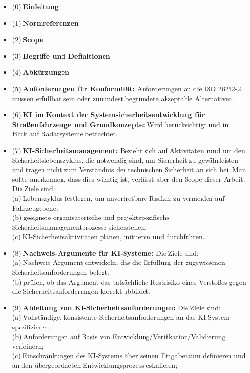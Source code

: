 \begin{itemize}
  \item[\dotY] (0) \textbf{Einleitung}
  \item[\dotR] (1) \textbf{Normreferenzen}
  \item[\dotY] (2) \textbf{Scope}
  \item[\dotR] (3) \textbf{Begriffe und Definitionen}
  \item[\dotR] (4) \textbf{Abkürzungen}
  \item[\dotR] (5) \textbf{Anforderungen für Konformität:}
    Anforderungen an die ISO 26262-2 müssen erfüllbar sein oder zumindest begründete akzeptable Alternativen.
  \item[\dotY] (6) \textbf{KI im Kontext der Systemsicherheitsentwicklung für Straßenfahrzeuge und Grundkonzepte:}
    Wird berücksichtigt und im Blick auf Radarsysteme betrachtet.
  \item[\dotR] (7) \textbf{KI-Sicherheitsmanagement:} Bezieht sich auf Aktivitäten rund um den Sicherheitslebenszyklus, 
    die notwendig sind, um Sicherheit zu gewährleisten und tragen nicht zum Verständnis der technischen Sicherheit an sich bei.
    Man sollte anerkennen, dass dies wichtig ist, verlässt aber den Scope dieser Arbeit. Die Ziele sind: \\
    (a) Lebenszyklus festlegen, um unvertretbare Risiken zu vermeiden auf Fahrzeugebene;\\
    (b) geeignete organisatorische und projektspezifische Sicherheitsmanagementprozesse sicherstellen;\\
    (c) KI-Sicherheitsaktivitäten planen, initiieren und durchführen.
  \item[\dotY] (8) \textbf{Nachweis-Argumente für KI-Systeme:} Die Ziele sind:\\ 
    (a) Nachweis-Argument entwickeln, das die Erfüllung der zugewiesenen Sicherheitsanforderungen belegt;\\
    (b) prüfen, ob das Argument das tatsächliche Restrisiko eines Verstoßes gegen die Sicherheitsanforderungen korrekt abbildet.
  \item[\dotG] (9) \textbf{Ableitung von KI-Sicherheitsanforderungen:} Die Ziele sind:\\
    (a) Vollständige, konsistente Sicherheitsanforderungen an das KI-System spezifizieren;\\
    (b) Anforderungen auf Basis von Entwicklung/Verifikation/Validierung verfeinern;\\
    (c) Einschränkungen des KI-Systems über seinen Eingaberaum definieren und an den übergeordneten Entwicklungsprozess eskalieren;\\

\end{itemize}
